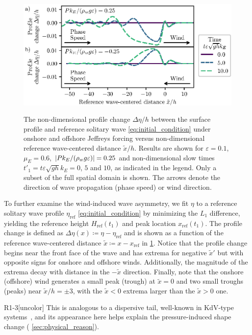 \documentclass{jfm}
\renewcommand*{\epsilon}{\varepsilon}
\begin{document}
\begin{figure}
  \centering
  { %
    \label{fig:snapshots_solitary_tail:a}
    \label{fig:snapshots_solitary_tail:b}
  }
  \includegraphics{Snapshots-Positive-Negative-Tail.eps}
  \caption{
    The non-dimensional profile change $\Delta \eta/h$ between the
    surface profile and reference solitary wave
    \cref{eq:initial_condition} under
     onshore and
     offshore Jeffreys forcing
    versus non-dimensional reference wave-centered distance
    $\tilde{x}/h$.
    Results are shown for $\epsilon=0.1$, $\mu_E = 0.6$, $\abs{P
    k_E/(\rho_w g \epsilon)} = 0.25$ and non-dimensional slow times
    $t'_1 = t \epsilon \sqrt{gh} k_E = 0$, $5$ and $10$, as indicated
    in the legend.
    Only a subset of the full spatial domain is shown.
    The arrows denote the direction of wave propagation (phase speed) or
    wind direction.
  }\label{fig:snapshots_solitary_tail}
\end{figure}

To further examine the wind-induced wave asymmetry, we fit $\eta$ to a
reference solitary wave profile $\eta_{\text{ref}}$
\cref{eq:initial_condition} by minimizing the $L_1$ difference, yielding
the reference height $H_{\text{ref}}(t_1)$ and peak location
$x_{\text{ref}}(t_1)$.
The profile change is defined as $\Delta \eta(x) \coloneqq \eta -
\eta_{\text{ref}}$ and is shown as a function of the reference
wave-centered distance $\tilde{x} \coloneqq x - x_{\text{ref}}$ in
\cref{fig:snapshots_solitary_tail}.
Notice that the profile change begins near the front face of the wave
and has extrema for negative $\tilde{x}'$ but with opposite signs for
onshore and offshore winds.
Additionally, the magnitude of the extrema decay with distance in the
$-\tilde{x}$ direction.
Finally, note that the onshore (offshore) wind generates a small peak
(trough) at $\tilde{x} = 0$ and two small troughs (peaks) near
$\tilde{x}/h = \pm 3$, with the $\tilde{x}<0$ extrema larger than the
$\tilde{x}>0$ one.
\begin{LineLabel}{R1-3}[uncolor]
This is analogous to a dispersive tail, well-known in KdV-type
systems~\citep[\eg][]{hammack1974korteweg}, and its appearance here
helps explain the pressure-induced shape change (\cf{}
\cref{sec:physical_reason}).
\end{LineLabel}
\end{document}
